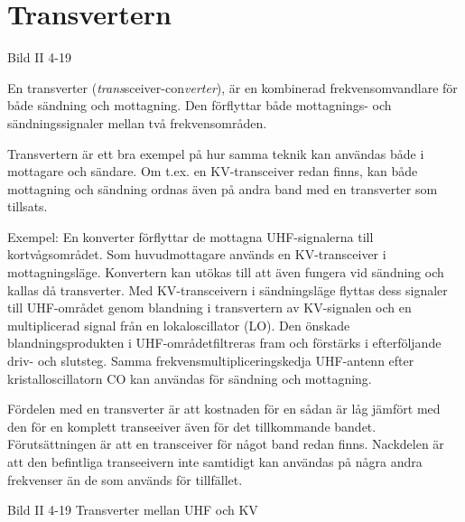 \section{Transvertern}

Bild II 4-19

En transverter (\emph{trans}sceiver-con\emph{verter}), är en
kombinerad frekvensomvandlare för både sändning och mottagning. Den
förflyttar både mottagnings- och sändningssignaler mellan två
frekvensområden.

Transvertern är ett bra exempel på hur samma teknik kan användas både
i mottagare och sändare. Om t.ex. en KV-transceiver redan finns, kan
både mottagning och sändning ordnas även på andra band med en
transverter som tillsats.

Exempel: En konverter förflyttar de mottagna UHF-signalerna till
kortvågsområdet. Som huvudmottagare används en KV-transceiver i
mottagningsläge. Konvertern kan utökas till att även fungera vid
sändning och kallas då transverter. Med KV-transceivern i
sändningsläge flyttas dess signaler till UHF-området genom blandning
i transvertern av KV-signalen och en multiplicerad signal från en
lokaloscillator (LO). Den önskade blandningsprodukten i
UHF-områdetfiltreras fram och förstärks i efterföljande driv- och
slutsteg. Samma frekvensmultipliceringskedja UHF-antenn efter
kristalloscillatorn CO kan användas för sändning och mottagning.

Fördelen med en transverter är att kostnaden för en sådan är låg
jämfört med den för en komplett transeeiver även för det tillkommande
bandet. Förutsättningen är att en transceiver för något band redan
finns.  Nackdelen är att den befintliga transeeivern inte samtidigt
kan användas på några andra frekvenser än de som används för
tillfället.

Bild II 4-19 Transverter mellan UHF och KV
